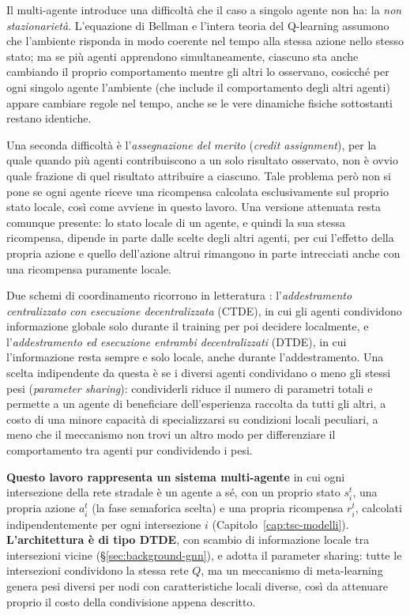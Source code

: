 Il multi-agente introduce una difficoltà che il caso a singolo agente non
ha: la \emph{non stazionarietà}. L'equazione di Bellman e l'intera teoria
del Q-learning assumono che l'ambiente risponda in modo coerente nel
tempo alla stessa azione nello stesso stato; ma se più agenti apprendono
simultaneamente, ciascuno sta anche cambiando il proprio comportamento
mentre gli altri lo osservano, cosicché per ogni singolo agente
l'ambiente (che include il comportamento degli altri agenti) appare
cambiare regole nel tempo, anche se le vere dinamiche fisiche sottostanti
restano identiche.

Una seconda difficoltà è
l'\emph{assegnazione del merito} (\emph{credit assignment}), per la quale quando più
agenti contribuiscono a un solo risultato osservato, non è ovvio quale
frazione di quel risultato attribuire a ciascuno. Tale problema però non si pone se ogni agente riceve una ricompensa
calcolata esclusivamente sul proprio stato locale, così come avviene in questo lavoro.
Una versione attenuata resta comunque presente: lo stato locale di un agente, e
quindi la sua stessa ricompensa, dipende in parte dalle scelte degli altri agenti, per cui
l'effetto della propria azione e quello dell'azione altrui rimangono in
parte intrecciati anche con una ricompensa puramente locale.

Due schemi di coordinamento ricorrono in letteratura
\citep{li2018drlsurvey}: l'\emph{addestramento centralizzato con
  esecuzione decentralizzata} (CTDE), in cui gli agenti condividono
informazione globale solo durante il training per poi decidere
localmente, e l'\emph{addestramento ed esecuzione entrambi
  decentralizzati} (DTDE), in cui l'informazione resta sempre e solo
locale, anche durante l'addestramento. Una scelta indipendente da questa
è se i diversi agenti condividano o meno gli stessi pesi (\emph{parameter
  sharing}): condividerli riduce il numero di parametri totali e permette a
un agente di beneficiare dell'esperienza raccolta da tutti gli altri, a
costo di una minore capacità di specializzarsi su condizioni locali
peculiari, a meno che il meccanismo non trovi un altro modo per
differenziare il comportamento tra agenti pur condividendo i pesi.

\textbf{Questo lavoro rappresenta un sistema multi-agente} in cui ogni intersezione della
rete stradale è un agente a sé, con un proprio stato $s_i^t$, una propria
azione $a_i^t$ (la fase semaforica scelta) e una propria ricompensa
$r_i^t$, calcolati indipendentemente per ogni intersezione $i$
(Capitolo~\ref{cap:tsc-modelli}). \textbf{L'architettura è di tipo DTDE}, con scambio di
informazione locale tra intersezioni vicine (§\ref{sec:background-gnn}), e
adotta il parameter sharing: tutte le intersezioni condividono la stessa
rete $Q$, ma un meccanismo di meta-learning genera pesi diversi per nodi con caratteristiche locali diverse, così da
attenuare proprio il costo della condivisione appena descritto.

